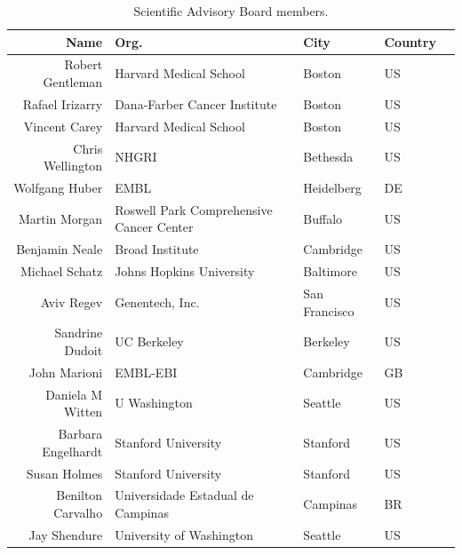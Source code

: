 \documentclass[letterpaper]{article}
\begin{document}
\begin{table}[ht]
\centering
\caption{Scientific Advisory Board members.}
\label{sabtable}
\begin{tabular}{rllll}
  \hline
 Name & Org. & City & Country \\ 
  \hline
 Robert Gentleman & Harvard Medical School & Boston & US \\ 
 Rafael Irizarry & Dana-Farber Cancer Institute & Boston & US \\ 
 Vincent Carey & Harvard Medical School & Boston & US \\ 
 Chris Wellington & NHGRI & Bethesda & US \\ 
 Wolfgang Huber & EMBL  & Heidelberg & DE \\ 
 Martin Morgan & Roswell Park Comprehensive Cancer Center & Buffalo & US \\ 
 Benjamin Neale & Broad Institute & Cambridge & US \\ 
 Michael Schatz & Johns Hopkins University & Baltimore & US \\ 
 Aviv Regev & Genentech, Inc. & San Francisco & US \\ 
 Sandrine Dudoit & UC Berkeley & Berkeley & US \\ 
 John Marioni & EMBL-EBI & Cambridge & GB \\ 
 Daniela M Witten & U Washington & Seattle & US \\ 
 Barbara Engelhardt & Stanford University & Stanford & US \\ 
 Susan Holmes & Stanford University & Stanford & US \\ 
 Benilton Carvalho & Universidade Estadual de Campinas & Campinas & BR \\ 
 Jay Shendure & University of Washington & Seattle & US \\ 
   \hline
\end{tabular}
\end{table}
\end{document}
